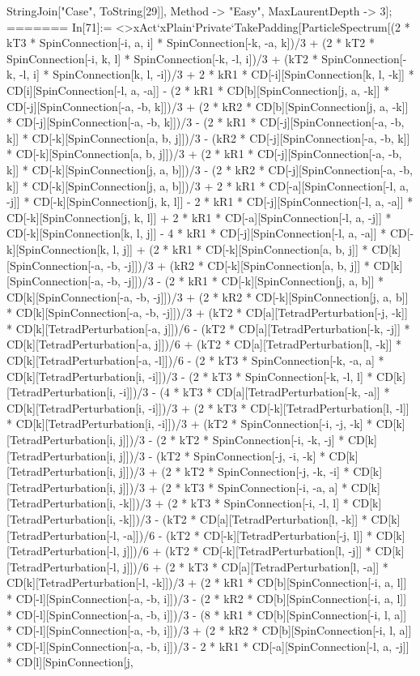 StringJoin["Case", ToString[29]], Method -> "Easy", MaxLaurentDepth -> 3]; 
=======
In[71]:= <>xAct`xPlain`Private`TakePadding[ParticleSpectrum[(2 * kT3 * SpinConnection[-i, a, i] * SpinConnection[-k, -a, k])/3 + (2 * kT2 * SpinConnection[-i, k, l] * SpinConnection[-k, -l, i])/3 + (kT2 * SpinConnection[-k, -l, i] * SpinConnection[k, l, -i])/3 + 2 * kR1 * CD[-i][SpinConnection[k, l, -k]] * CD[i][SpinConnection[-l, a, -a]] - (2 * kR1 * CD[b][SpinConnection[j, a, -k]] * CD[-j][SpinConnection[-a, -b, k]])/3 + (2 * kR2 * CD[b][SpinConnection[j, a, -k]] * CD[-j][SpinConnection[-a, -b, k]])/3 - (2 * kR1 * CD[-j][SpinConnection[-a, -b, k]] * CD[-k][SpinConnection[a, b, j]])/3 - (kR2 * CD[-j][SpinConnection[-a, -b, k]] * CD[-k][SpinConnection[a, b, j]])/3 + (2 * kR1 * CD[-j][SpinConnection[-a, -b, k]] * CD[-k][SpinConnection[j, a, b]])/3 - (2 * kR2 * CD[-j][SpinConnection[-a, -b, k]] * CD[-k][SpinConnection[j, a, b]])/3 + 2 * kR1 * CD[-a][SpinConnection[-l, a, -j]] * CD[-k][SpinConnection[j, k, l]] - 2 * kR1 * CD[-j][SpinConnection[-l, a, -a]] * CD[-k][SpinConnection[j, k, l]] + 2 * kR1 * CD[-a][SpinConnection[-l, a, -j]] * CD[-k][SpinConnection[k, l, j]] - 4 * kR1 * CD[-j][SpinConnection[-l, a, -a]] * CD[-k][SpinConnection[k, l, j]] + (2 * kR1 * CD[-k][SpinConnection[a, b, j]] * CD[k][SpinConnection[-a, -b, -j]])/3 + (kR2 * CD[-k][SpinConnection[a, b, j]] * CD[k][SpinConnection[-a, -b, -j]])/3 - (2 * kR1 * CD[-k][SpinConnection[j, a, b]] * CD[k][SpinConnection[-a, -b, -j]])/3 + (2 * kR2 * CD[-k][SpinConnection[j, a, b]] * CD[k][SpinConnection[-a, -b, -j]])/3 + (kT2 * CD[a][TetradPerturbation[-j, -k]] * CD[k][TetradPerturbation[-a, j]])/6 - (kT2 * CD[a][TetradPerturbation[-k, -j]] * CD[k][TetradPerturbation[-a, j]])/6 + (kT2 * CD[a][TetradPerturbation[l, -k]] * CD[k][TetradPerturbation[-a, -l]])/6 - (2 * kT3 * SpinConnection[-k, -a, a] * CD[k][TetradPerturbation[i, -i]])/3 - (2 * kT3 * SpinConnection[-k, -l, l] * CD[k][TetradPerturbation[i, -i]])/3 - (4 * kT3 * CD[a][TetradPerturbation[-k, -a]] * CD[k][TetradPerturbation[i, -i]])/3 + (2 * kT3 * CD[-k][TetradPerturbation[l, -l]] * CD[k][TetradPerturbation[i, -i]])/3 + (kT2 * SpinConnection[-i, -j, -k] * CD[k][TetradPerturbation[i, j]])/3 - (2 * kT2 * SpinConnection[-i, -k, -j] * CD[k][TetradPerturbation[i, j]])/3 - (kT2 * SpinConnection[-j, -i, -k] * CD[k][TetradPerturbation[i, j]])/3 + (2 * kT2 * SpinConnection[-j, -k, -i] * CD[k][TetradPerturbation[i, j]])/3 + (2 * kT3 * SpinConnection[-i, -a, a] * CD[k][TetradPerturbation[i, -k]])/3 + (2 * kT3 * SpinConnection[-i, -l, l] * CD[k][TetradPerturbation[i, -k]])/3 - (kT2 * CD[a][TetradPerturbation[l, -k]] * CD[k][TetradPerturbation[-l, -a]])/6 - (kT2 * CD[-k][TetradPerturbation[-j, l]] * CD[k][TetradPerturbation[-l, j]])/6 + (kT2 * CD[-k][TetradPerturbation[l, -j]] * CD[k][TetradPerturbation[-l, j]])/6 + (2 * kT3 * CD[a][TetradPerturbation[l, -a]] * CD[k][TetradPerturbation[-l, -k]])/3 + (2 * kR1 * CD[b][SpinConnection[-i, a, l]] * CD[-l][SpinConnection[-a, -b, i]])/3 - (2 * kR2 * CD[b][SpinConnection[-i, a, l]] * CD[-l][SpinConnection[-a, -b, i]])/3 - (8 * kR1 * CD[b][SpinConnection[-i, l, a]] * CD[-l][SpinConnection[-a, -b, i]])/3 + (2 * kR2 * CD[b][SpinConnection[-i, l, a]] * CD[-l][SpinConnection[-a, -b, i]])/3 - 2 * kR1 * CD[-a][SpinConnection[-l, a, -j]] * CD[l][SpinConnection[j, 